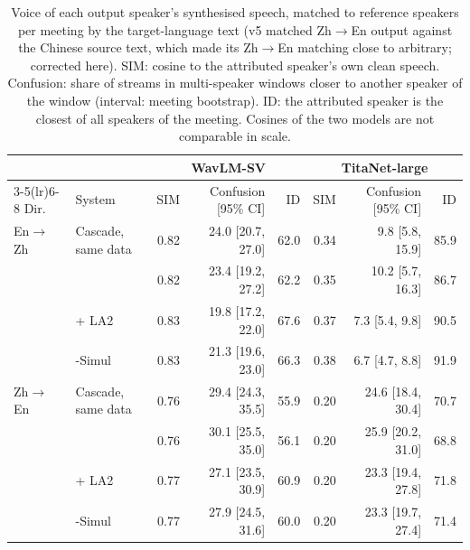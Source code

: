 \begin{table}[t]
\centering\small
\setlength{\tabcolsep}{4pt}
\begin{tabular}{llrrrrrr}
\toprule
 & & \multicolumn{3}{c}{WavLM-SV} & \multicolumn{3}{c}{TitaNet-large} \\
\cmidrule(lr){3-5}\cmidrule(lr){6-8}
Dir. & System & SIM & Confusion [95\% CI] & ID & SIM & Confusion [95\% CI] & ID \\
\midrule
En$\rightarrow$Zh & Cascade, same data & 0.82 & 24.0 [20.7, 27.0] & 62.0 & 0.34 & 9.8 [5.8, 15.9] & 85.9 \\
 & \sys{} & 0.82 & 23.4 [19.2, 27.2] & 62.2 & 0.35 & 10.2 [5.7, 16.3] & 86.7 \\
 & \sys{} + LA2 & 0.83 & 19.8 [17.2, 22.0] & 67.6 & 0.37 & 7.3 [5.4, 9.8] & 90.5 \\
 & \sys{}-Simul & 0.83 & 21.3 [19.6, 23.0] & 66.3 & 0.38 & 6.7 [4.7, 8.8] & 91.9 \\
\midrule
Zh$\rightarrow$En & Cascade, same data & 0.76 & 29.4 [24.3, 35.5] & 55.9 & 0.20 & 24.6 [18.4, 30.4] & 70.7 \\
 & \sys{} & 0.76 & 30.1 [25.5, 35.0] & 56.1 & 0.20 & 25.9 [20.2, 31.0] & 68.8 \\
 & \sys{} + LA2 & 0.77 & 27.1 [23.5, 30.9] & 60.9 & 0.20 & 23.3 [19.4, 27.8] & 71.8 \\
 & \sys{}-Simul & 0.77 & 27.9 [24.5, 31.6] & 60.0 & 0.20 & 23.3 [19.7, 27.4] & 71.4 \\
\bottomrule
\end{tabular}
\caption{Voice of each output speaker's synthesised speech, matched to reference speakers per meeting by the target-language text (v5 matched Zh$\rightarrow$En output against the Chinese source text, which made its Zh$\rightarrow$En matching close to arbitrary; corrected here). SIM: cosine to the attributed speaker's own clean speech. Confusion: share of streams in multi-speaker windows closer to another speaker of the window (interval: meeting bootstrap). ID: the attributed speaker is the closest of all speakers of the meeting. Cosines of the two models are not comparable in scale.}
\label{tab:voice}
\end{table}
